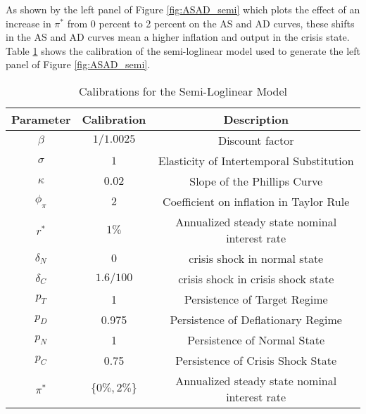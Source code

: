\documentclass[11pt]{article}
\begin{document}
\begin{singlespace}
		As shown by the left panel of Figure \ref{fig:ASAD_semi} which plots the effect of an increase in $\pi^*$ from 0 percent to 2 percent on the AS and AD curves, these shifts in the AS and AD curves mean a higher inflation and output in the crisis state. Table \ref{calib} shows the calibration of the semi-loglinear model used to generate the left panel of Figure \ref{fig:ASAD_semi}.
		\begin{table}
			\centering
			\caption{Calibrations for the Semi-Loglinear Model\label{calib}}
{\footnotesize
			\begin{tabular}{ccc}
				\hline
				\hline
				Parameter & Calibration & Description\\
				\hline
				$\beta$ & $1/1.0025$ & Discount factor \\
				$\sigma$ & $1$ & Elasticity of Intertemporal Substitution\\
				$\kappa$  & $0.02$ & Slope of the Phillips Curve \\
				$\phi_{\pi}$ & $2$ & Coefficient on inflation in Taylor Rule \\
				$r^*$ & $1\%$ & Annualized steady state nominal interest rate \\
				$\delta_N$ & $0$ & crisis shock in normal state \\
				$\delta_C$ & $1.6/100$ & crisis shock in crisis shock state \\
				\hline
				$p_T$ & 1 & Persistence of Target Regime \\
				$p_D$ & 0.975 & Persistence of Deflationary Regime \\
				$p_{N}$ & 1 & Persistence of Normal State \\
				$p_C$ & 0.75 & Persistence of Crisis Shock State \\
				\hline 
				$\pi^*$ & $\{0\%, 2\%\}$ & Annualized steady state nominal interest rate \\
				\hline
				\hline
			\end{tabular}
}		\end{table}


\end{singlespace}
\end{document}
